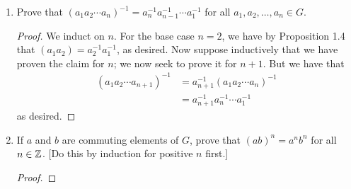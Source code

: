 \documentclass[../main.tex]{subfiles}
\begin{document}
\begin{enumerate}[label={\textbf{\arabic*.}}]
\begin{enumerate}[label={\textbf{(\alph*)}}]
\begin{proof}
            Axiom (i): As stated in the text, the associativity of a closed subset of a group under the same operation follows from the associativity of the original group.\par
            Axiom (ii): Clearly, $1=1+0i\in\C$ and $1^1=1$, so $1\in G$. Additionally, by the definition of 1, $z\cdot 1=1\cdot z=z$, as desired.\par
            Axiom (iii): Let $z\in G$ be arbitrary. Choose $z^{-1}=z^{n-1}$. Then
            \begin{align*}
                z\cdot z^{-1} &= z\cdot z^{n-1}\\
                &= z^n\\
                &= 1\\
                &= z^n\\
                &= z^{n-1}\cdot z\\
                &= z^{-1}\cdot z
            \end{align*}
            as desired.
        \end{proof}
        \item Prove that $G$ is not a group under addition.
        \begin{proof}
            By part (a), $1\in G$. However, $1+1=2\notin G$ since $2^n$ grows exponentially and never equals 1.
        \end{proof}
    \end{enumerate}
    \setcounter{enumi}{14}
    \item Prove that $(a_1a_2\cdots a_n)^{-1}=a_n^{-1}a_{n-1}^{-1}\cdots a_1^{-1}$ for all $a_1,a_2,\dots,a_n\in G$.
    \begin{proof}
        We induct on $n$. For the base case $n=2$, we have by Proposition 1.4 that $(a_1a_2)=a_2^{-1}a_1^{-1}$, as desired. Now suppose inductively that we have proven the claim for $n$; we now seek to prove it for $n+1$. But we have that
        \begin{align*}
            (a_1a_2\cdots a_{n+1})^{-1} &= a_{n+1}^{-1}(a_1a_2\cdots a_n)^{-1}\tag*{Proposition 1.4}\\
            &= a_{n+1}^{-1}a_n^{-1}\cdots a_1^{-1}\tag*{Hypothesis}
        \end{align*}
        as desired.
    \end{proof}
    \setcounter{enumi}{23}
    \item If $a$ and $b$ are commuting elements of $G$, prove that $(ab)^n=a^nb^n$ for all $n\in\mathbb{Z}$. [Do this by induction for positive $n$ first.]
    \begin{proof}

\end{proof}
\end{enumerate}
\end{document}
